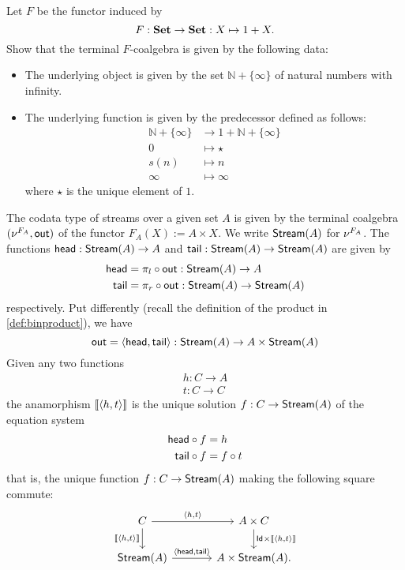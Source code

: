 \begin{exer} \label{exer:conatural_numbers_terminal_coalgebra} Let $F$ be the functor induced by 
\[
F:\SET\to\SET : X\mapsto 1 + X.
\]
Show that the terminal $F$-coalgebra is given by the following data:
\begin{itemize}
\item The underlying object is given by the set $\mathbb{N} + \{\infty\}$ of natural numbers with infinity.
\item The underlying function is given by the predecessor defined as follows: 
\begin{align*}
  \mathbb{N} + \{\infty\} &\to 1 + \mathbb{N} + \{\infty\}
  \\
  0 &\mapsto \star
  \\
  s(n) &\mapsto n
  \\
  \infty &\mapsto \infty
\end{align*}
where $\star$ is the unique element of $1$.
\end{itemize}
\end{exer}


\begin{exa}[Streams]
  The codata type of streams over a given set $A$ is given by the terminal coalgebra $(\Terminalcoalg{F_A}, \Out)$ of the functor $F_A (X) := A \times X$.
  We write $\Stream(A)$ for $\Terminalcoalg{F_A}$.
  The functions $\head : \Stream(A) \to A$ and $\tail : \Stream(A) \to \Stream(A)$
  are given by
  \begin{align*}
    \head &= \co{\Out}{\projl} : \Stream(A) \to A
    \\
    \tail &= \co{\Out}{\projr} : \Stream(A) \to \Stream(A)
  \end{align*}
  respectively. Put differently (recall the definition of the product in \cref{def:binproduct}), we have
  \[
    \Out = \langle \head, \tail \rangle : \Stream(A) \to A \times \Stream(A)
  \] 
  Given any two functions
  \begin{align*}
    h : C \to  A
    \\
    t : C \to C
  \end{align*}
  the anamorphism $\anam{\langle h, t \rangle }$ is the unique solution
  $f : C \to  \Stream(A)$
  of the equation system
  \begin{align*}
    \co{f} \head &= h
    \\
    \co f \tail &=  \co t f
  \end{align*}
  that is, the unique function $f : C \to \Stream(A)$ making the following square commute:
  \[
    \begin{tikzcd}[column sep = large]
      C
      \ar[r, "{\langle h, t \rangle}"]
      \ar[d, "\anam{\langle h, t \rangle}"']
      &
      A \times C
      \ar[d, "\Id \times \anam{\langle h, t \rangle}"]
      \\
      \Stream(A)
      \ar[r, "{\langle \head, \tail \rangle}"]
      &
      A \times \Stream(A).
    \end{tikzcd}
  \]
  
\end{exa}

